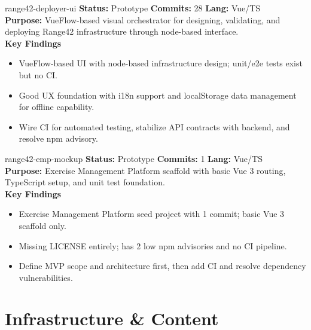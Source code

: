 \documentclass[aspectratio=169]{beamer}
\begin{document}
\begin{frame}{range42-deployer-ui \; \faDrawPolygon}
  \textbf{Status:} Prototype \hfill \textbf{Commits:} 28 \hfill \textbf{Lang:} Vue/TS\\[2mm]
  \textbf{Purpose:} VueFlow-based visual orchestrator for designing, validating, and deploying Range42 infrastructure through node-based interface.\\[2mm]
  \textbf{Key Findings}
  \begin{itemize}
    \item VueFlow-based UI with node-based infrastructure design; unit/e2e tests exist but no CI.
    \item Good UX foundation with i18n support and localStorage data management for offline capability.
    \item Wire CI for automated testing, stabilize API contracts with backend, and resolve npm advisory.
  \end{itemize}
\end{frame}

\begin{frame}{range42-emp-mockup \; \faChalkboardTeacher}
  \textbf{Status:} Prototype \hfill \textbf{Commits:} 1 \hfill \textbf{Lang:} Vue/TS\\[2mm]
  \textbf{Purpose:} Exercise Management Platform scaffold with basic Vue 3 routing, TypeScript setup, and unit test foundation.\\[2mm]
  \textbf{Key Findings}
  \begin{itemize}
    \item Exercise Management Platform seed project with 1 commit; basic Vue 3 scaffold only.
    \item Missing LICENSE entirely; has 2 low npm advisories and no CI pipeline.
    \item Define MVP scope and architecture first, then add CI and resolve dependency vulnerabilities.
  \end{itemize}
\end{frame}

\section{Infrastructure \& Content}
\end{document}

